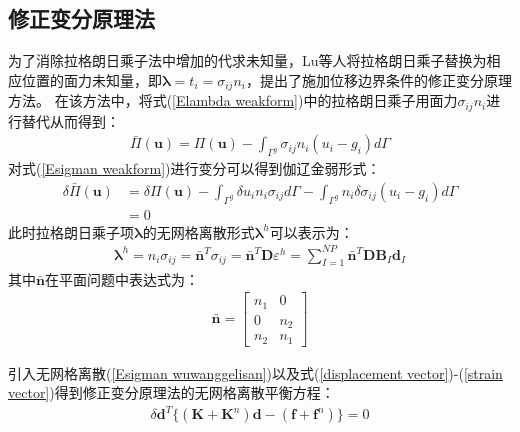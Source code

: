 \subsection{修正变分原理法}
为了消除拉格朗日乘子法中增加的代求未知量，Lu等人将拉格朗日乘子替换为相应位置的面力未知量，即$\pmb{\lambda}=t_i=\sigma_{ij}n_i$，提出了施加位移边界条件的修正变分原理方法。
在该方法中，将式(\ref{Elambda weakform})中的拉格朗日乘子用面力$\sigma_{ij}n_i$进行替代从而得到：
\begin{equation}
\begin{split}\label{Esigman weakform}
    \bar{\Pi}(\pmb{u})=\Pi(\pmb{u})-\int_{\Gamma^g}\sigma_{ij}n_i(u_i-g_i)d\Gamma
\end{split}
\end{equation}
对式(\ref{Esigman weakform})进行变分可以得到伽辽金弱形式：
\begin{equation}
\begin{split}
    \delta\bar{\Pi}(\pmb{u})&=\delta\Pi(\pmb{u})-\int_{\Gamma^g}\delta u_in_i\sigma_{ij}d\Gamma-\int_{\Gamma^g}n_i\delta\sigma_{ij}(u_i-g_i)d\Gamma\\
    &=0
\end{split}
\end{equation}
此时拉格朗日乘子项$\pmb{\lambda}$的无网格离散形式$\pmb{\lambda}^h$可以表示为：
\begin{equation}\label{Esigman wuwanggelisan}
\begin{split}
    \pmb{\lambda}^h=n_i\sigma_{ij}=\bar{\pmb n}^T\sigma_{ij}=\bar{\pmb n}^T\pmb{D}\varepsilon^h=\sum_{I=1}^{N\!P}\bar{\pmb n}^T\pmb{D}\pmb{B}_I\pmb{d}_I
\end{split}
\end{equation}
其中$\bar{\pmb{n}}$在平面问题中表达式为：
\begin{equation}
\begin{split}
    \bar{\pmb n}=\left[\begin{matrix}n_1&0\\0&n_2\\n_2&n_1
    \end{matrix}\right]
\end{split}
\end{equation}\par
引入无网格离散(\ref{Esigman wuwanggelisan})以及式(\ref{displacement vector})-(\ref{strain vector})得到修正变分原理法的无网格离散平衡方程：
\begin{equation}
\begin{split}
   \delta\pmb{d}^T\{(\pmb{K}+\pmb{K}^n)\pmb{d}-(\pmb{f}+\pmb{f}^n)\}=0\\
\end{split}
\end{equation}
